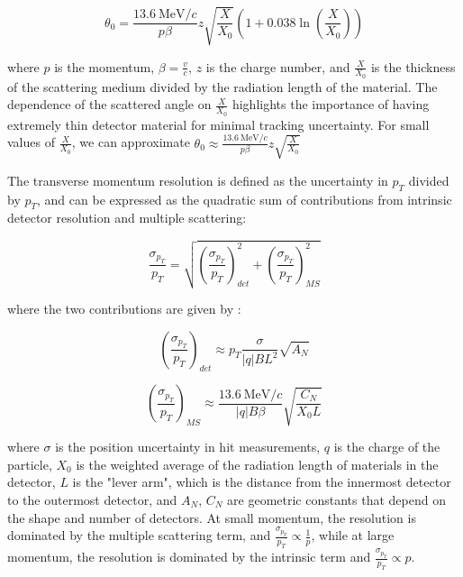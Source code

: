 \documentclass[titlepage]{article}[11pt]
\begin{document}
\begin{equation}
	\theta_0 = \frac{\qty{13.6}{\mega \electronvolt \per \ensuremath{c}}}{p \beta} z \sqrt{\frac{X}{X_0}} \left(1 + 0.038 \ln{\left(\frac{X}{X_0}\right)} \right) \label{eq:multiple_scattering} 
\end{equation}

\noindent
where $p$ is the momentum, $\beta = \frac{v}{c}$, $z$ is the charge number, and $\frac{X}{X_0}$ is the thickness of the scattering medium divided by the radiation length of the material. The dependence of the scattered angle on $\frac{X}{X_0}$ highlights the importance of having extremely thin detector material for minimal tracking uncertainty. For small values of $\frac{X}{X_0}$, we can approximate $\theta_0 \approx \frac{\qty{13.6}{\mega \electronvolt \per \ensuremath{c}}}{p \beta} z \sqrt{\frac{X}{X_0}}$

The transverse momentum resolution is defined as the uncertainty in $p_T$ divided by $p_T$, and can be expressed as the quadratic sum of contributions from intrinsic detector resolution and multiple scattering:

\begin{equation}
	\frac{\sigma_{p_T}}{p_T}  = \sqrt{\left(\frac{\sigma_{p_T}}{p_T} \right)^2_{det}  + \left(\frac{\sigma_{p_T}}{p_T} \right)^2_{MS}}
\end{equation}

\noindent
where the two contributions are given by \cite{osti_4142694}:

\begin{equation}
	\left(\frac{\sigma_{p_T}}{p_T} \right)_{det} \approx p_T \frac{\sigma}{|q| B L^2} \sqrt{A_N} \label{eq:momentum_det_resolution}
\end{equation}

\begin{equation}
	\left(\frac{\sigma_{p_T}}{p_T} \right)_{MS} \approx \frac{\qty{13.6}{\mega \electronvolt \per \ensuremath{c}}}{|q| B \beta} \sqrt{\frac{C_N}{X_0 L}} \label{eq:momentum_MS_resolution}
\end{equation}

where $\sigma$ is the position uncertainty in hit measurements, $q$ is the charge of the particle, $X_0$ is the weighted average of the radiation length of materials in the detector, $L$ is the "lever arm", which is the distance from the innermost detector to the outermost detector, and $A_N$, $C_N$ are geometric constants that depend on the shape and number of detectors. At small momentum, the resolution is dominated by the multiple scattering term, and $\frac{\sigma_{p_T}}{p_T} \propto \frac{1}{p}$, while at large momentum, the resolution is dominated by the intrinsic term and $\frac{\sigma_{p_T}}{p_T} \propto p$. 
\end{document}
